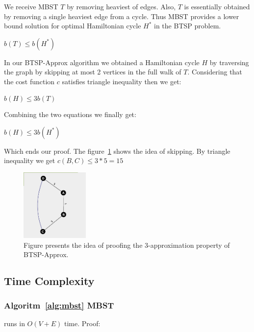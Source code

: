 \documentclass[runningheads, a4paper]{llncs}
\begin{document}
We receive MBST $T$ by removing heaviest of edges. Also, $T$ is essentially obtained by removing a single heaviest edge from a cycle. Thus MBST provides a lower bound solution for optimal Hamiltonian cycle $H^*$ in the BTSP problem.
\begin{center}
    $b(T) \leq b(H^*)$
\end{center}

In our BTSP-Approx algorithm we obtained a Hamiltonian cycle $H$ by traversing the graph by skipping at most 2 vertices in the full walk of $T$. Considering that the cost function $c$ satisfies triangle inequality then we get:

\begin{center}
    $b(H) \leq 3b(T)$
\end{center}

Combining the two equations we finally get:

\begin{center}
    $b(H) \leq 3b(H^*)$
\end{center}
Which  ends our proof.
The figure~\ref{fig:3approx_proof} shows the idea of skipping. By triangle inequality we get $c(B,C) \leq 3 * 5 = 15$
\begin{figure}[H]
    \includegraphics[width=0.30\textwidth]{res/3approx_proof.png}
    \caption{Figure presents the idea of proofing the 3-approximation property of BTSP-Approx.}
    \label{fig:3approx_proof}
\end{figure}

\subsection{Time Complexity}
\subsubsection{Algoritm~\ref{alg:mbst} MBST}
runs in $O(V+E)$ time. Proof:
\end{document}
